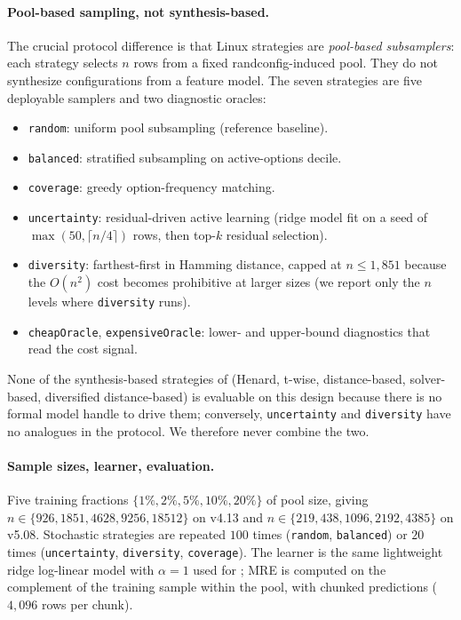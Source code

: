 \paragraph*{Pool-based sampling, not synthesis-based.}
The crucial protocol difference is that Linux strategies are
\emph{pool-based subsamplers}: each strategy selects $n$ rows from a
fixed randconfig-induced pool. They do not synthesize configurations
from a feature model. The seven strategies are five deployable
samplers and two diagnostic oracles:
\begin{itemize}
    \item \texttt{random}: uniform pool subsampling (reference baseline).
    \item \texttt{balanced}: stratified subsampling on
    active-options decile.
    \item \texttt{coverage}: greedy option-frequency matching.
    \item \texttt{uncertainty}: residual-driven active learning
    (ridge model fit on a seed of $\max(50, \lceil n/4\rceil)$ rows,
    then top-$k$ residual selection).
    \item \texttt{diversity}: farthest-first in Hamming distance,
    capped at $n\le 1{,}851$ because the $O(n^{2})$ cost becomes
    prohibitive at larger sizes (we report only the $n$ levels where
    \texttt{diversity} runs).
    \item \texttt{cheapOracle}, \texttt{expensiveOracle}: lower- and
    upper-bound diagnostics that read the cost signal.
\end{itemize}
None of the synthesis-based strategies of
 (Henard, t-wise, distance-based,
solver-based, diversified distance-based) is evaluable on this design
because there is no formal model handle to drive them; conversely,
\texttt{uncertainty} and \texttt{diversity} have no analogues in the
\StudyReplication protocol. We therefore never combine the two.

\paragraph*{Sample sizes, learner, evaluation.}
Five training fractions $\{1\%, 2\%, 5\%, 10\%, 20\%\}$ of pool size,
giving $n\in\{926, 1851, 4628, 9256, 18512\}$ on v4.13 and
$n\in\{219, 438, 1096, 2192, 4385\}$ on v5.08. Stochastic strategies
are repeated $100$ times (\texttt{random}, \texttt{balanced}) or $20$
times (\texttt{uncertainty}, \texttt{diversity}, \texttt{coverage}).
The learner is the same lightweight ridge log-linear model with
$\alpha=1$ used for \StudyReplication; MRE is computed on the
complement of the training sample within the pool, with chunked
predictions ($4{,}096$ rows per chunk).

